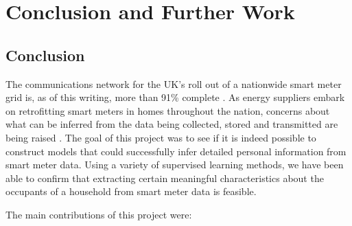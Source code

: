 \chapter{Conclusion and Further Work}

\section{Conclusion}
The communications network for the UK's roll out of a nationwide smart meter grid is, as of this writing, more than 91\% complete \cite{DCC}.  As energy suppliers embark on retrofitting smart meters in homes throughout the nation, concerns about what can be inferred from the data being collected, stored and transmitted are being raised \cite{Anderson}.  The goal of this project was to see if it is indeed possible to construct models that could successfully infer detailed personal information from smart meter data.  Using a variety of supervised learning methods, we have been able to confirm that extracting certain meaningful characteristics about the occupants of a household from smart meter data is feasible. 

The main contributions of this project were:


